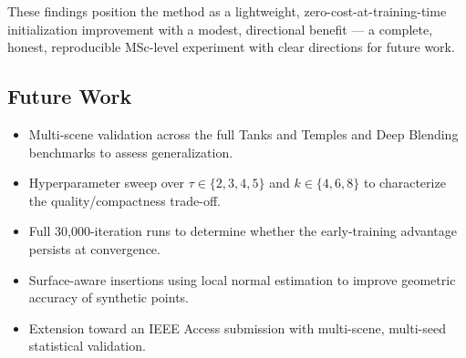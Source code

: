 \documentclass[12pt, a4paper]{article}
\begin{document}
These findings position the method as a lightweight, zero-cost-at-training-time
initialization improvement with a modest, directional benefit --- a complete,
honest, reproducible MSc-level experiment with clear directions for future work.

\subsection*{Future Work}

\begin{itemize}
    \item Multi-scene validation across the full Tanks and Temples and Deep
    Blending benchmarks to assess generalization.

    \item Hyperparameter sweep over $\tau \in \{2, 3, 4, 5\}$ and
    $k \in \{4, 6, 8\}$ to characterize the quality/compactness trade-off.

    \item Full 30{,}000-iteration runs to determine whether the early-training
    advantage persists at convergence.

    \item Surface-aware insertions using local normal estimation to improve
    geometric accuracy of synthetic points.

    \item Extension toward an IEEE Access submission with multi-scene,
    multi-seed statistical validation.
\end{itemize}
\end{document}
